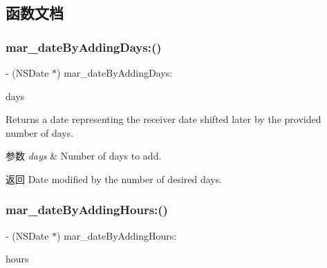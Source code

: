 \subsection{函数文档}
\mbox{\label{category_n_s_date_07_m_a_r_e_x_08_a071430ab41ab298a62052c2823668b6f}} 
\subsubsection{\texorpdfstring{mar\+\_\+date\+By\+Adding\+Days\+:()}{mar\_dateByAddingDays:()}}
{\footnotesize\ttfamily -\/ (N\+S\+Date $\ast$) mar\+\_\+date\+By\+Adding\+Days\+: \begin{DoxyParamCaption}\item[{(N\+S\+Integer)}]{days }\end{DoxyParamCaption}}

Returns a date representing the receiver date shifted later by the provided number of days.


\begin{DoxyParams}{参数}
{\em days} & Number of days to add. \\
\hline
\end{DoxyParams}
\begin{DoxyReturn}{返回}
Date modified by the number of desired days. 
\end{DoxyReturn}
\mbox{\label{category_n_s_date_07_m_a_r_e_x_08_ab0c07450a4cfe456a24ff903273e85ee}} 
\subsubsection{\texorpdfstring{mar\+\_\+date\+By\+Adding\+Hours\+:()}{mar\_dateByAddingHours:()}}
{\footnotesize\ttfamily -\/ (N\+S\+Date $\ast$) mar\+\_\+date\+By\+Adding\+Hours\+: \begin{DoxyParamCaption}\item[{(N\+S\+Integer)}]{hours }\end{DoxyParamCaption}}

